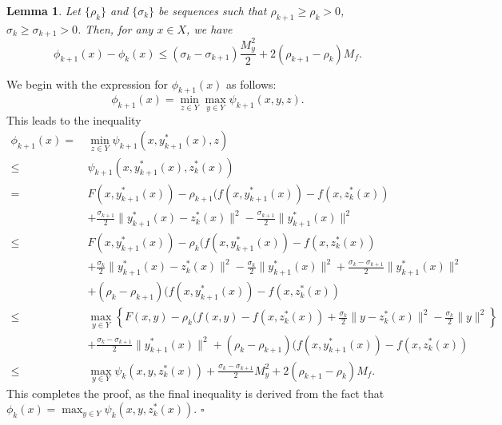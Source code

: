 \documentclass{article}
\newtheorem{lemma}[theorem]{Lemma}
\newenvironment{proof}[1][Proof]{\par
	\normalfont\topsep6pt\relax
	\trivlist\item[\hskip\labelsep\itshape #1.]\ignorespaces
}{%
	\hfill\ensuremath{\square}\endtrivlist
}
\begin{document}
\begin{lemma}\label{lem_b6}
    Let $\{\rho_k\}$ and $\{\sigma_k\}$ be sequences such that  $\rho_{k+1} \ge \rho_{k}>0$, $\sigma_{k} \ge\sigma_{k+1}>0$. Then, for any $x \in X$, we have 
    \begin{equation}
        \phi_{k+1}(x) - \phi_{k}(x) \le \left( \sigma_k - \sigma_{k+1} \right)\frac{M_y^2 }{2} + 2\left(\rho_{k+1}-\rho_{k}\right)M_f.
    \end{equation}
\end{lemma}
\begin{proof}
    We begin with the expression for $\phi_{k+1}(x)$ as follows: $$\phi_{k+1}(x) = \min_{z \in {Y}} \max_{ y \in {Y}}\psi_{k+1}(x, y, z).$$
This leads to the inequality
  \begin{equation*}
    \begin{aligned}
    \phi_{k+1}(x) =\, & \min_{ z \in {Y}} \psi_{k+1}(x, y_{k+1}^*(x), z) \\
    \le \,& \psi_{k+1}(x, y_{k+1}^*(x), z_k^*(x)) \\
         =\, &  F(x, y_{k+1}^*(x)) - \rho_{k+1}( f(x, y_{k+1}^*(x)) - f(x, z_{k}^*(x)) \\
         & + \frac{\sigma_{k+1}}{2}\|y_{k+1}^*(x) - z_{k}^*(x)\|^2 - \frac{\sigma_{k+1}}{2}\|y_{k+1}^*(x)\|^2 \\
         \le \, &  F(x, y_{k+1}^*(x)) - \rho_{k}( f(x, y_{k+1}^*(x)) - f(x, z_{k}^*(x)) \\
         &+ \frac{\sigma_{k}}{2}\|y_{k+1}^*(x) - z_{k}^*(x)\|^2 - \frac{\sigma_{k}}{2}\|y_{k+1}^*(x)\|^2 + \frac{\sigma_k - \sigma_{k+1}}{2}\|y_{k+1}^*(x)\|^2 \\
         & +   \left(\rho_{k}-\rho_{k+1}\right)( f(x, y_{k+1}^*(x)) - f(x, z_{k}^*(x))  \\
      \le \, & \max_{ y \in {Y}} \left\{ F(x, y) - \rho_{k}( f(x, y) - f(x, z_{k}^*(x)) + \frac{\sigma_{k}}{2}\|y - z_{k}^*(x)\|^2 - \frac{\sigma_{k}}{2}\|y\|^2 \right\} \\
        &+ \frac{\sigma_k - \sigma_{k+1}}{2}\|y_{k+1}^*(x)\|^2  +   \left(\rho_{k}-\rho_{k+1}\right)( f(x, y_{k+1}^*(x)) - f(x, z_{k}^*(x)) \\
        \le \, & \max_{ y \in {Y}}\psi_{k}(x, y, z_k^*(x)) + \frac{\sigma_k - \sigma_{k+1}}{2}M_y^2  + 2\left(\rho_{k+1}-\rho_{k}\right)M_f.
    \end{aligned}
    \end{equation*}
    This completes the proof, as the final inequality is derived from the fact that $\phi_k(x) = \max_{ y \in {Y}}\psi_{k}(x, y, z_k^*(x))$.
\end{proof}
\end{document}
